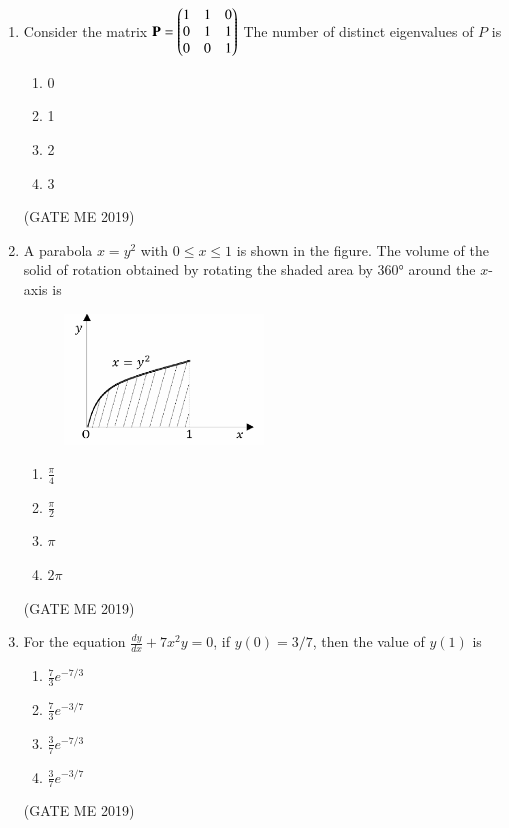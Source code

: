 \documentclass[journal]{IEEEtran}
\begin{document}
\begin{enumerate}
\item Consider the matrix
$\mathbf{P} = \begin{pmatrix}1 & 1 & 0 \\
                  0 & 1 & 1 \\
                  0 & 0 & 1\end{pmatrix} $
The number of distinct eigenvalues of $ P $ is
\begin{multicols}{4}
\begin{enumerate}
    \item 0
    \item 1
    \item 2
    \item 3
\end{enumerate}
\end{multicols}
\hfill (GATE ME 2019)

\item A parabola $ x = y^2 $ with $ 0 \leq x \leq 1 $ is shown in the figure. The volume of the solid of rotation obtained by rotating the shaded area by 360° around the $ x $-axis is

\begin{figure}[H]
\centering
\includegraphics[width=0.5\textwidth]{Fig 2.png}
\caption{}
\label{fig:question2}
\end{figure}

\begin{multicols}{2}
\begin{enumerate}
    \item $\frac{\pi}{4}$
    \item $\frac{\pi}{2}$
    \item $\pi$
    \item $2\pi$
\end{enumerate}
\end{multicols}
\hfill (GATE ME 2019)

\item For the equation $\frac{dy}{dx} + 7x^2y = 0$, if $ y(0) = 3/7 $, then the value of $ y(1) $ is
\begin{multicols}{2}
\begin{enumerate}
    \item $\frac{7}{3} e^{-7/3}$
    \item $\frac{7}{3} e^{-3/7}$
    \item $\frac{3}{7} e^{-7/3}$
    \item $\frac{3}{7} e^{-3/7}$
\end{enumerate}
\end{multicols}
\hfill (GATE ME 2019)


\end{enumerate}
\end{document}
